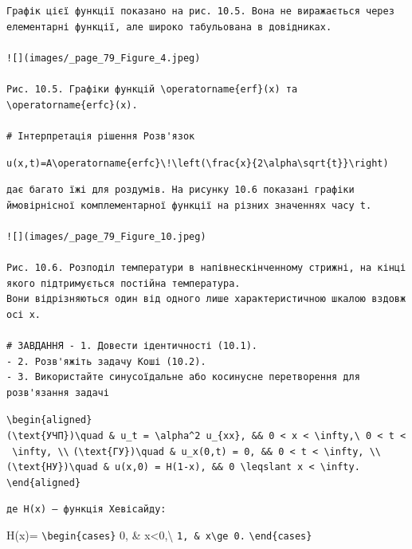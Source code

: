 \documentclass[
  ukrainian,
]{article}
\begin{document}
\begin{verbatim}
Графік цієї функції показано на рис. 10.5. Вона не виражається через елементарні функції, але широко табульована в довідниках.

![](images/_page_79_Figure_4.jpeg)

Рис. 10.5. Графіки функцій \operatorname{erf}(x) та \operatorname{erfc}(x).

# Інтерпретація рішення Розв'язок
\end{verbatim}

\texttt{u(x,t)=A\textbackslash{}operatorname\{erfc\}\textbackslash{}!\textbackslash{}left(\textbackslash{}frac\{x\}\{2\textbackslash{}alpha\textbackslash{}sqrt\{t\}\}\textbackslash{}right)}

\begin{verbatim}
дає багато їжі для роздумів. На рисунку 10.6 показані графіки ймовірнісної комплементарної функції на різних значеннях часу t.

![](images/_page_79_Figure_10.jpeg)

Рис. 10.6. Розподіл температури в напівнескінченному стрижні, на кінці якого підтримується постійна температура.
Вони відрізняються один від одного лише характеристичною шкалою вздовж осі x.

# ЗАВДАННЯ - 1. Довести ідентичності (10.1).
- 2. Розв'яжіть задачу Коші (10.2).
- 3. Використайте синусоїдальне або косинусне перетворення для розв'язання задачі
\end{verbatim}

\texttt{\textbackslash{}begin\{aligned\}}
\texttt{(\textbackslash{}text\{УЧП\})\textbackslash{}quad\ \&\ u\_t\ =\ \textbackslash{}alpha\^{}2\ u\_\{xx\},\ \&\&\ 0\ \textless{}\ x\ \textless{}\ \textbackslash{}infty,\textbackslash{}\ 0\ \textless{}\ t\ \textless{}\ \textbackslash{}infty,\ \textbackslash{}\textbackslash{}}
\texttt{(\textbackslash{}text\{ГУ\})\textbackslash{}quad\ \&\ u\_x(0,t)\ =\ 0,\ \&\&\ 0\ \textless{}\ t\ \textless{}\ \textbackslash{}infty,\ \textbackslash{}\textbackslash{}}
\texttt{(\textbackslash{}text\{НУ\})\textbackslash{}quad\ \&\ u(x,0)\ =\ H(1-x),\ \&\&\ 0\ \textbackslash{}leqslant\ x\ \textless{}\ \textbackslash{}infty.}
\texttt{\textbackslash{}end\{aligned\}}

\begin{verbatim}
де H(x) — функція Хевісайду:
\end{verbatim}

H(x)= \texttt{\textbackslash{}begin\{cases\}} 0, \&
x\textless0,\textbackslash{} \texttt{1,\ \&\ x\textbackslash{}ge\ 0.}
\texttt{\textbackslash{}end\{cases\}}
\end{document}

